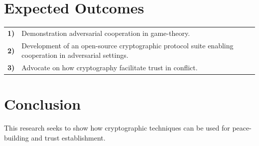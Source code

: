 \documentclass[conference]{IEEEtran}
\begin{document}


\section{Expected Outcomes}

\begin{tabular}{lp{210pt}}
    {\small \textbf{1)}} & {\small Demonstration adversarial cooperation in game-theory.} \\
    {\small \textbf{2)}} & {\small Development of an open-source cryptographic protocol suite enabling cooperation in adversarial settings.} \\
    {\small \textbf{3)}} & {\small Advocate on how cryptography facilitate trust in conflict.}
\end{tabular}

\section{Conclusion}
This research seeks to show how cryptographic techniques can be used for peace-building and trust establishment. 
\end{document}
